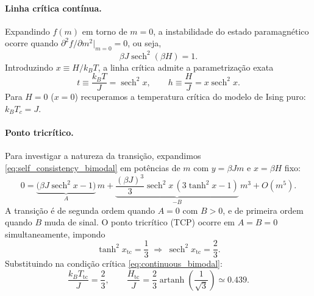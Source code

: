 \documentclass[12pt,a4paper]{article}
\newcommand{\sech}{\operatorname{sech}}
\begin{document}
\paragraph{Linha crítica contínua.}
Expandindo $f(m)$ em torno de $m=0$, a instabilidade do estado
paramagnético ocorre quando $\partial^2 f/\partial m^2|_{m=0}=0$, ou seja,
%
\begin{equation}
    \beta J\sech^2(\beta H)=1.
    \label{eq:continuous_bimodal}
\end{equation}
%
Introduzindo $x\equiv H/k_BT$, a linha crítica admite a parametrização exata
%
\begin{equation}
    t\equiv\frac{k_BT}{J}=\sech^2 x,
    \qquad
    h\equiv\frac{H}{J}=x\sech^2 x.
    \label{eq:critical_line}
\end{equation}
%
Para $H=0$ ($x=0$) recuperamos a temperatura crítica do modelo de Ising puro:
$k_BT_c=J$.

\paragraph{Ponto tricrítico.}
Para investigar a natureza da transição, expandimos
\eqref{eq:self_consistency_bimodal} em potências de $m$
com $y=\beta Jm$ e $x=\beta H$ fixo:
%
\begin{equation}
    0
    =
    \underbrace{\bigl(\beta J\sech^2 x-1\bigr)}_{A}\,m
    +
    \underbrace{\frac{(\beta J)^3}{3}\sech^2 x\,(3\tanh^2 x-1)}_{-B}\,m^3
    +O(m^5).
    \label{eq:landau_equation}
\end{equation}
%
A transição é de segunda ordem quando $A=0$ com $B>0$, e de primeira ordem
quando $B$ muda de sinal. O ponto tricrítico (TCP) ocorre em $A=B=0$
simultaneamente, impondo
%
\begin{equation}
    \tanh^2 x_{\mathrm{tc}}=\frac{1}{3}
    \;\Longrightarrow\;
    \sech^2 x_{\mathrm{tc}}=\frac{2}{3}.
    \label{eq:tcp_condition}
\end{equation}
%
Substituindo na condição crítica \eqref{eq:continuous_bimodal}:
%
\begin{equation}
    \boxed{
    \frac{k_BT_{\mathrm{tc}}}{J}=\frac{2}{3},
    \qquad
    \frac{H_{\mathrm{tc}}}{J}
    =\frac{2}{3}\operatorname{artanh}\!\left(\frac{1}{\sqrt{3}}\right)
    \simeq 0.439.
    }
    \label{eq:tcp}
\end{equation}
\end{document}
